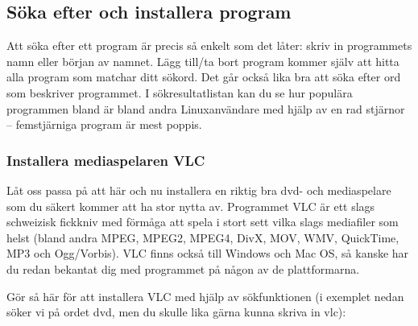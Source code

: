 \documentclass[a4paper,final]{memoir} %
\begin{document}

\subsection{Söka efter och installera program}\label{vlc}


Att söka efter ett program är precis så enkelt som det låter: skriv in programmets namn eller början av namnet. Lägg till/ta bort program kommer själv att hitta alla program som matchar ditt sökord. Det går också lika bra att söka efter ord som beskriver programmet. I sökresultatlistan kan du se hur populära programmen bland är bland andra Linuxanvändare med hjälp av en rad stjärnor -- femstjärniga program är mest poppis.

\subsubsection{Installera mediaspelaren VLC}

Låt oss passa på att här och nu installera en riktig bra dvd- och mediaspelare som du säkert kommer att ha stor nytta av. Programmet VLC är ett slags schweizisk fickkniv med förmåga att spela i stort sett vilka slags mediafiler som helst (bland andra MPEG, MPEG2, MPEG4, DivX, MOV, WMV, QuickTime, MP3 och Ogg/Vorbis). VLC finns också till Windows och Mac OS, så kanske har du redan bekantat dig med programmet på någon av de plattformarna.

Gör så här för att installera VLC med hjälp av sökfunktionen (i exemplet nedan söker vi på ordet dvd, men du skulle lika gärna kunna skriva in vlc):
\end{document}
